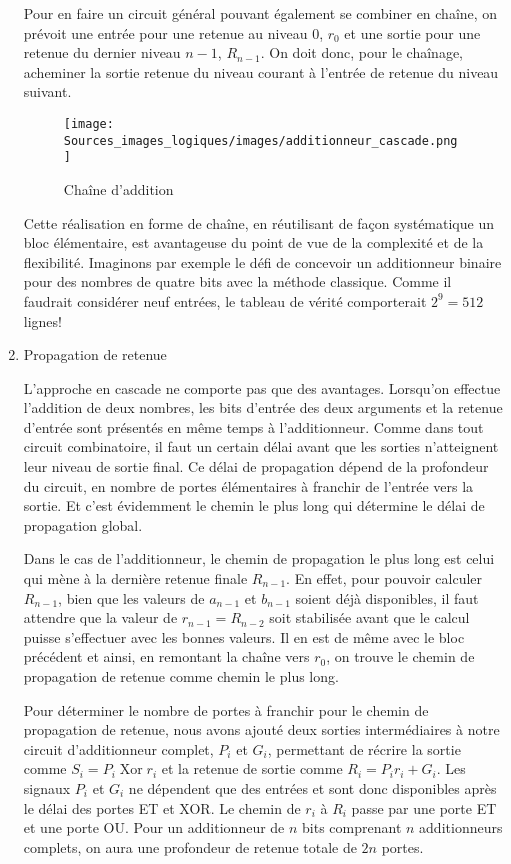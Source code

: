 \documentclass[letter, oneside]{book}
\begin{document}
\begin{enumerate}
Pour en faire un circuit général pouvant également se combiner en
chaîne, on prévoit une entrée pour une retenue au niveau 0, \(r_0\) et
une sortie pour une retenue du dernier niveau \(n-1\), \(R_{n-1}\). On
doit donc, pour le chaînage, acheminer la sortie retenue du niveau
courant à l'entrée de retenue du niveau suivant.


\begin{figure}[htbp]
\centering
\texttt{[image: Sources\_images\_logiques/images/additionneur\_cascade.png]}
\caption{\label{fig:orgcc6528a}Chaîne d'addition}
\end{figure}

Cette réalisation en forme de chaîne, en réutilisant de façon
systématique un bloc élémentaire, est avantageuse du point de vue de
la complexité et de la flexibilité. Imaginons par exemple le défi de
concevoir un additionneur binaire pour des nombres de quatre bits avec
la méthode classique. Comme il faudrait considérer neuf entrées, le
tableau de vérité comporterait \(2^9= 512\) lignes!

\item Propagation de retenue
\label{sec:orgfeeb007}

L'approche en cascade ne comporte pas que des avantages. Lorsqu'on
effectue l'addition de deux nombres, les bits d'entrée des deux
arguments et la retenue d'entrée sont présentés en même temps à
l'additionneur.  Comme dans tout circuit combinatoire, il faut un
certain délai avant que les sorties n'atteignent leur niveau de sortie
final.  Ce délai de propagation dépend de la profondeur du circuit, en
nombre de portes élémentaires à franchir de l'entrée vers la
sortie.  Et c'est évidemment le chemin le plus long qui détermine le
délai de propagation global.  

Dans le cas de l'additionneur, le chemin de propagation le plus long
est celui qui mène à la dernière retenue finale \(R_{n-1}\).  En
effet, pour pouvoir calculer \(R_{n-1}\), bien que les valeurs de
\(a_{n-1}\) et \(b_{n-1}\) soient déjà disponibles, il faut attendre
que la valeur de \(r_{n-1} = R_{n-2}\) soit stabilisée avant que le
calcul puisse s'effectuer avec les bonnes valeurs. Il en est de même
avec le bloc précédent et ainsi, en remontant la chaîne vers \(r_0\),
on trouve le chemin de propagation de retenue comme chemin le plus
long.

Pour déterminer le nombre de portes à franchir pour le chemin de
propagation de retenue, nous avons ajouté deux sorties intermédiaires
à notre circuit d'additionneur complet, \(P_i\) et \(G_i\), permettant
de récrire la sortie comme \(S_i = P_i  \operatorname{Xor} r_i\) et la retenue de
sortie comme \(R_i = P_i r_i + G_i\). Les signaux \(P_i\) et \(G_i\)
ne dépendent que des entrées et sont donc disponibles après le délai
des portes ET et XOR. Le chemin de \(r_i\) à \(R_i\) passe par une
porte ET et une porte OU. Pour un additionneur de \(n\) bits
comprenant \(n\) additionneurs complets, on aura une profondeur de
retenue totale de \(2n\) portes.



\end{enumerate}
\end{document}

